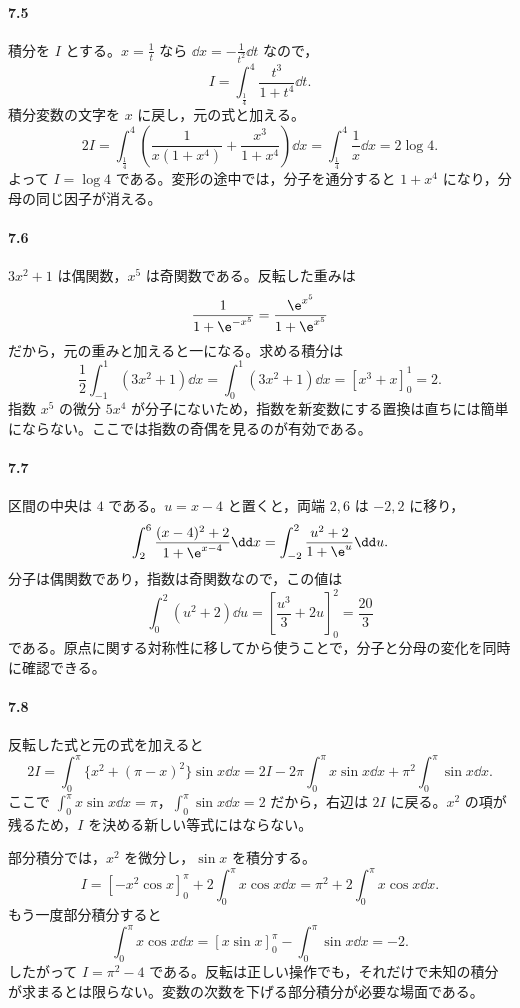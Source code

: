 \paragraph{7.5}
積分を $I$ とする。$x=\frac1t$ なら $\dd x=-\frac1{t^2}\dd t$ なので，
\[
I=\int_{\frac14}^4\frac{t^3}{1+t^4}\dd t.
\]
積分変数の文字を $x$ に戻し，元の式と加える。
\[
2I=\int_{\frac14}^4
\left(\frac{1}{x(1+x^4)}+\frac{x^3}{1+x^4}\right)\dd x
 =\int_{\frac14}^4\frac{1}{x}\dd x
 =2\log4.
\]
よって $I=\log4$ である。変形の途中では，分子を通分すると $1+x^4$ になり，分母の同じ因子が消える。

\paragraph{7.6}
$3x^2+1$ は偶関数，$x^5$ は奇関数である。反転した重みは
\[
\frac{1}{1+\e^{-x^5}}=\frac{\e^{x^5}}{1+\e^{x^5}}
\]
だから，元の重みと加えると一になる。求める積分は
\[
\frac12\int_{-1}^1(3x^2+1)\dd x
 =\int_0^1(3x^2+1)\dd x
 =\left[x^3+x\right]_0^1=2.
\]
指数 $x^5$ の微分 $5x^4$ が分子にないため，指数を新変数にする置換は直ちには簡単にならない。ここでは指数の奇偶を見るのが有効である。

\paragraph{7.7}
区間の中央は $4$ である。$u=x-4$ と置くと，両端 $2,6$ は $-2,2$ に移り，
\[
\int_2^6\frac{(x-4)^2+2}{1+\e^{x-4}}\dd x
 =\int_{-2}^2\frac{u^2+2}{1+\e^u}\dd u.
\]
分子は偶関数であり，指数は奇関数なので，この値は
\[
\int_0^2(u^2+2)\dd u
 =\left[\frac{u^3}{3}+2u\right]_0^2
 =\frac{20}{3}
\]
である。原点に関する対称性に移してから使うことで，分子と分母の変化を同時に確認できる。

\paragraph{7.8}
反転した式と元の式を加えると
\[
2I=\int_0^\pi\{x^2+(\pi-x)^2\}\sin x\dd x
 =2I-2\pi\int_0^\pi x\sin x\dd x
  +\pi^2\int_0^\pi\sin x\dd x.
\]
ここで $\int_0^\pi x\sin x\dd x=\pi$，$\int_0^\pi\sin x\dd x=2$ だから，右辺は $2I$ に戻る。$x^2$ の項が残るため，$I$ を決める新しい等式にはならない。

部分積分では，$x^2$ を微分し，$\sin x$ を積分する。
\[
I=\left[-x^2\cos x\right]_0^\pi
  +2\int_0^\pi x\cos x\dd x
 =\pi^2+2\int_0^\pi x\cos x\dd x.
\]
もう一度部分積分すると
\[
\int_0^\pi x\cos x\dd x
 =\left[x\sin x\right]_0^\pi-\int_0^\pi\sin x\dd x
 =-2.
\]
したがって $I=\pi^2-4$ である。反転は正しい操作でも，それだけで未知の積分が求まるとは限らない。変数の次数を下げる部分積分が必要な場面である。
